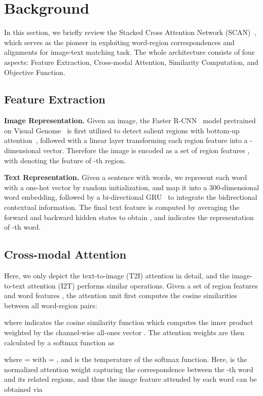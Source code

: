 \documentclass[journal]{IEEEtran}\newcommand{\ignore}[1]{}
\begin{document}
\section{Background}
In this section, we briefly review the Stacked Cross Attention Network (SCAN)~\cite{SCAN}, which serves as the pioneer in exploiting word-region correspondences and alignments for image-text matching task. The whole architecture consists of four aspects: Feature Extraction, Cross-modal Attention, Similarity Computation, and Objective Function.

\subsection{Feature Extraction}
\label{secFE}
\textbf{Image Representation.} 
Given an image, the Faster R-CNN~\cite{FasterR-CNN} model pretrained on Visual Genome~\cite{VisualGenome} is first utilized to detect  salient regions with bottom-up attention~\cite{BU_TDA}, followed with a linear layer transforming each region feature into a -dimensional vector. Therefore the image is encoded as a set of region features , with  denoting the feature of -th region.


\textbf{Text Representation.}
Given a sentence with  words, we represent each word with a one-hot vector by random initialization, and map it into a 300-dimensional word embedding, followed by a bi-directional GRU~\cite{Bi-GRU} to integrate the bidirectional contextual information. The final text feature is computed by averaging the forward and backward hidden states to obtain , and  indicates the representation of -th word. 


\subsection{Cross-modal Attention}
Here, we only depict the text-to-image (T2I) attention in detail, and the image-to-text attention (I2T) performs similar operations. Given a set of region features  and word features , the attention unit first computes the cosine similarities between all word-region pairs:

where  indicates the cosine similarity function which computes the inner product weighted by the channel-wise all-ones vector . The attention weights are then calculated by a softmax function as
 
where  =  with  = , and  is the temperature of the softmax function. 
Here,  is the normalized attention weight capturing the correspondence between the -th word and its related regions, and thus the image feature attended by each word can be obtained via
\end{document}
